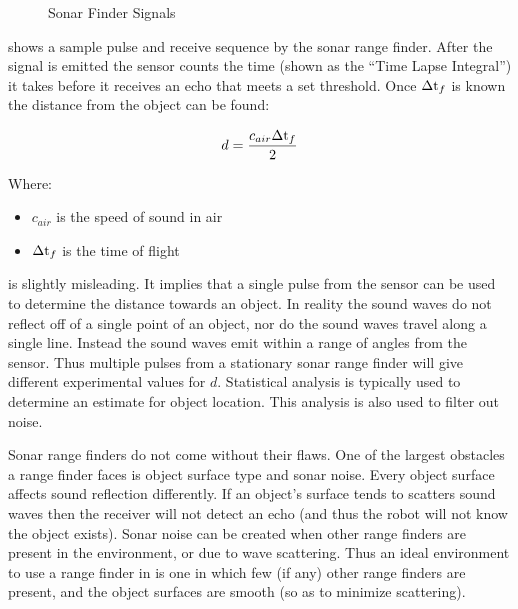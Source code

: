 \documentclass[main.tex]{subfiles}
\begin{document}
\begin{figure}[H]
	\begin{center}
		
	\end{center}
	\caption{Sonar Finder Signals}
	\label{fig:ultraSig}
\end{figure}

 shows a sample pulse and receive sequence by the sonar range
finder. After the signal is emitted the sensor counts the time (shown as the
``Time Lapse Integral'') it takes before it receives an echo that meets a set
threshold. Once $\Delta\mathrm{t}_f$ is known the distance from the object can be found: 

\begin{equation}
\label{ultDEq}
d = \frac{c_{air}\Delta\mathrm{t}_f}{2}
\end{equation}

Where: 
\begin{itemize}
\item $c_{air}$ is the speed of sound in air
\item $\Delta\mathrm{t}_f$ is the time of flight
\end{itemize}

 is slightly misleading. It implies that a single pulse from the
sensor can be used to determine the distance towards an object. In reality the
sound waves do not reflect off of a single point of an object, nor do the sound
waves travel along a single line. Instead the sound waves emit within a range of
angles from the sensor. Thus multiple pulses from a stationary sonar range
finder will give different experimental values for $d$. Statistical analysis is
typically used to determine an estimate for object location. This analysis is
also used to filter out noise.

Sonar range finders do not come without their flaws. One of the largest
obstacles a range finder faces is object surface type and sonar noise. Every
object surface affects sound reflection differently. If an object's surface
tends to scatters sound waves then the receiver will not detect an echo (and
thus the robot will not know the object exists). Sonar noise can be created when
other range finders are present in the environment, or due to wave scattering.
Thus an ideal environment to use a range finder in is one in which few (if any)
other range finders are present, and the object surfaces are smooth (so as to
minimize scattering). 
\end{document}
